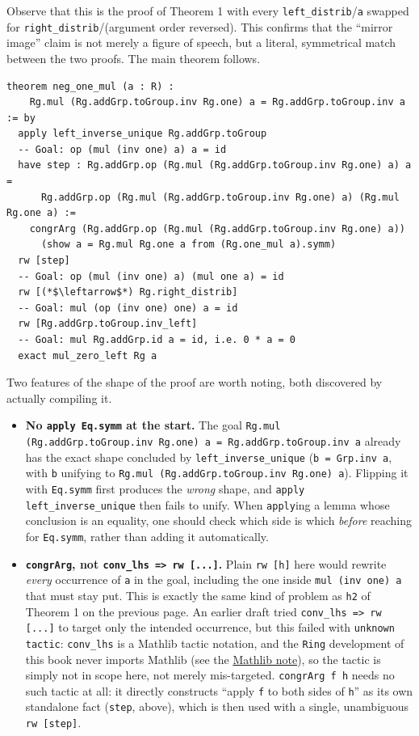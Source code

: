 Observe that this is the proof of Theorem 1 with every \texttt{left\_\allowbreak{}distrib}/\texttt{a} swapped for \texttt{right\_\allowbreak{}distrib}/(argument order reversed). This confirms that the ``mirror image'' claim is not merely a figure of speech, but a literal, symmetrical match between the two proofs. The main theorem follows.

\begin{lstlisting}
theorem neg_one_mul (a : R) :
    Rg.mul (Rg.addGrp.toGroup.inv Rg.one) a = Rg.addGrp.toGroup.inv a := by
  apply left_inverse_unique Rg.addGrp.toGroup
  -- Goal: op (mul (inv one) a) a = id
  have step : Rg.addGrp.op (Rg.mul (Rg.addGrp.toGroup.inv Rg.one) a) a =
      Rg.addGrp.op (Rg.mul (Rg.addGrp.toGroup.inv Rg.one) a) (Rg.mul Rg.one a) :=
    congrArg (Rg.addGrp.op (Rg.mul (Rg.addGrp.toGroup.inv Rg.one) a))
      (show a = Rg.mul Rg.one a from (Rg.one_mul a).symm)
  rw [step]
  -- Goal: op (mul (inv one) a) (mul one a) = id
  rw [(*$\leftarrow$*) Rg.right_distrib]
  -- Goal: mul (op (inv one) one) a = id
  rw [Rg.addGrp.toGroup.inv_left]
  -- Goal: mul Rg.addGrp.id a = id, i.e. 0 * a = 0
  exact mul_zero_left Rg a
\end{lstlisting}

Two features of the shape of the proof are worth noting, both discovered by actually compiling it.

\begin{itemize}
\tightlist
\item
  \textbf{No \texttt{apply Eq.symm} at the start.} The goal \texttt{Rg.mul (Rg.addGrp.toGroup.inv Rg.one) a = Rg.addGrp.toGroup.inv a} already has the exact shape concluded by \texttt{left\_\allowbreak{}inverse\_\allowbreak{}unique} (\texttt{b = Grp.inv a}, with \texttt{b} unifying to \texttt{Rg.mul (Rg.addGrp.toGroup.inv Rg.one) a}). Flipping it with \texttt{Eq.symm} first produces the \emph{wrong} shape, and \texttt{apply left\_\allowbreak{}inverse\_\allowbreak{}unique} then fails to unify. When \texttt{apply}ing a lemma whose conclusion is an equality, one should check which side is which \emph{before} reaching for \texttt{Eq.symm}, rather than adding it automatically.
\item
  \textbf{\texttt{congrArg}, not \texttt{conv\_\allowbreak{}lhs => rw [...]}.} Plain \texttt{rw [h]} here would rewrite \emph{every} occurrence of \texttt{a} in the goal, including the one inside \texttt{mul (inv one) a} that must stay put. This is exactly the same kind of problem as \texttt{h2} of Theorem 1 on the previous page. An earlier draft tried \texttt{conv\_\allowbreak{}lhs => rw [...]} to target only the intended occurrence, but this failed with \texttt{unknown tactic}: \texttt{conv\_\allowbreak{}lhs} is a Mathlib tactic notation, and the \texttt{Ring} development of this book never imports Mathlib (see the \hyperref[sec:00-setup:04-mathlib-note:1]{Mathlib note}), so the tactic is simply not in scope here, not merely mis-targeted. \texttt{congrArg f h} needs no such tactic at all: it directly constructs ``apply \texttt{f} to both sides of \texttt{h}'' as its own standalone fact (\texttt{step}, above), which is then used with a single, unambiguous \texttt{rw [step]}.
\end{itemize}

